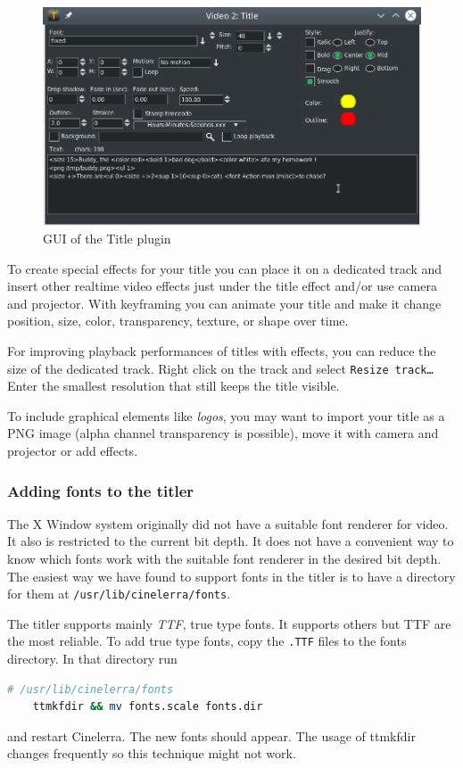 \begin{figure}[hbtp]
    \centering
    \includegraphics[width=0.9\linewidth]{images/title01.png}
    \caption{GUI of the Title plugin}
    \label{fig:title01}
\end{figure}

To create special effects for your title you can place it on a dedicated track and insert other realtime video effects just under the title effect and/or use camera and projector. With keyframing you can animate your title and make it change position, size, color, transparency, texture, or shape over time.

For improving playback performances of titles with effects, you can reduce the size of the dedicated track. Right click on the track and select \texttt{Resize track\dots} Enter the smallest resolution that still keeps the title visible.

To include graphical elements like \textit{logos}, you may want to import your title as a PNG image (alpha channel transparency is possible), move it with camera and projector or add effects.

\subsubsection*{Adding fonts to the titler}%
\label{ssub:adding_fonts_to_titler}

The X Window system originally did not have a suitable font renderer for video. It also is restricted to the current bit depth. It does not have a convenient way to know which fonts work with the suitable font renderer in the desired bit depth. The easiest way we have found to support fonts in the titler is to have a directory for them at \texttt{/usr/lib/cinelerra/fonts}.

The titler supports mainly \textit{TTF}, true type fonts. It supports others but TTF are the most reliable. To add true type fonts, copy the \texttt{.TTF} files to the fonts directory. In that directory run
\vspace{1ex}
\begin{lstlisting}[language=bash]
    # /usr/lib/cinelerra/fonts
    ttmkfdir && mv fonts.scale fonts.dir
\end{lstlisting}
and restart Cinelerra. The new fonts should appear. The usage of ttmkfdir changes frequently so this technique might not work. 

